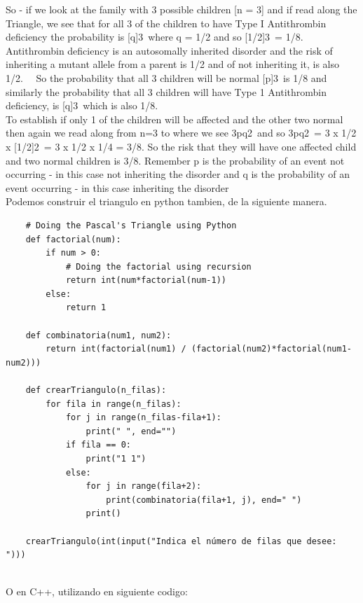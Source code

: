 \noindent So - if we look at the family with 3 possible children [n = 3] and if read along the Triangle, we see that for all 3 of the children to have Type I Antithrombin deficiency the probability is [q]3 where q = 1/2 and so [1/2]3 = 1/8. \\
\noindent Antithrombin deficiency is an autosomally inherited disorder and the risk of inheriting a mutant allele from a parent is 1/2 and of not inheriting it, is also 1/2.   So the probability that all 3 children will be normal [p]3 is 1/8 and similarly the probability that all 3 children will have Type 1 Antithrombin deficiency, is [q]3 which is also 1/8. \\
To establish if only 1 of the children will be affected and the other two normal then again we read along from n=3 to where we see 3pq2 and so 3pq2 = 3 x 1/2 x [1/2]2 = 3 x 1/2 x 1/4 = 3/8. So the risk that they will have one affected child and two normal children is 3/8.
\noindent Remember p is the probability of an event not occurring - in this case not inheriting the disorder and q is the probability of an event occurring - in this case inheriting the disorder \\

\noindent Podemos construir el triangulo en python tambien, de la siguiente manera. \\

\begin{verbatim}
    # Doing the Pascal's Triangle using Python
    def factorial(num):
        if num > 0:
            # Doing the factorial using recursion
            return int(num*factorial(num-1))
        else:
            return 1
    
    def combinatoria(num1, num2):
        return int(factorial(num1) / (factorial(num2)*factorial(num1-num2)))
    
    def crearTriangulo(n_filas):
        for fila in range(n_filas):
            for j in range(n_filas-fila+1):
                print(" ", end="")
            if fila == 0:
                print("1 1")
            else:
                for j in range(fila+2):
                    print(combinatoria(fila+1, j), end=" ")
                print()
    
    crearTriangulo(int(input("Indica el número de filas que desee: ")))
    
\end{verbatim}

\noindent O en C++, utilizando en siguiente codigo:\\

